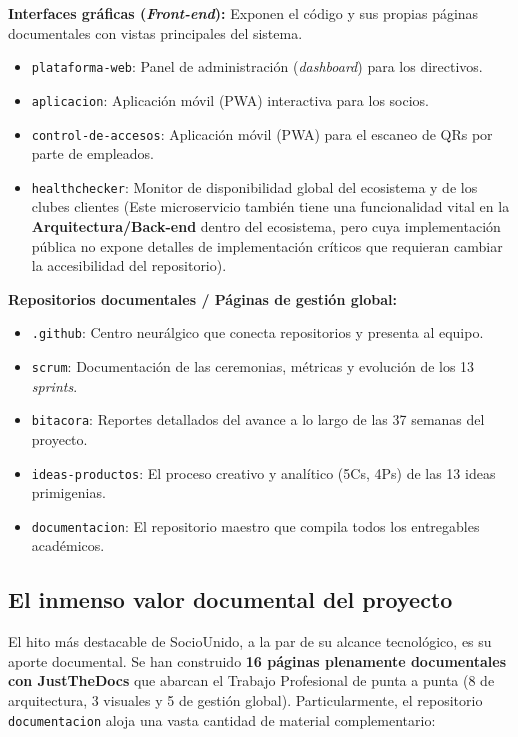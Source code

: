 \textbf{Interfaces gráficas (\textit{Front-end}):} Exponen el código y sus propias páginas documentales con vistas principales del sistema.
\begin{itemize}
    \item \texttt{plataforma-web}: Panel de administración (\textit{dashboard}) para los directivos.
    \item \texttt{aplicacion}: Aplicación móvil (PWA) interactiva para los socios.
    \item \texttt{control-de-accesos}: Aplicación móvil (PWA) para el escaneo de QRs por parte de empleados.
    \item \texttt{healthchecker}: Monitor de disponibilidad global del ecosistema y de los clubes clientes (Este microservicio también tiene una funcionalidad vital en la \textbf{Arquitectura/Back-end} dentro del ecosistema, pero cuya implementación pública no expone detalles de implementación críticos que requieran cambiar la accesibilidad del repositorio).
\end{itemize}

\textbf{Repositorios documentales / Páginas de gestión global:}
\begin{itemize}
    \item \texttt{.github}: Centro neurálgico que conecta repositorios y presenta al equipo.
    \item \texttt{scrum}: Documentación de las ceremonias, métricas y evolución de los 13 \textit{sprints}.
    \item \texttt{bitacora}: Reportes detallados del avance a lo largo de las 37 semanas del proyecto.
    \item \texttt{ideas-productos}: El proceso creativo y analítico (5Cs, 4Ps) de las 13 ideas primigenias.
    \item \texttt{documentacion}: El repositorio maestro que compila todos los entregables académicos.
\end{itemize}

\subsection{El inmenso valor documental del proyecto}

El hito más destacable de SocioUnido, a la par de su alcance tecnológico, es su aporte documental. Se han construido \textbf{16 páginas plenamente documentales con JustTheDocs} que abarcan el Trabajo Profesional de punta a punta (8 de arquitectura, 3 visuales y 5 de gestión global). Particularmente, el repositorio \texttt{documentacion} aloja una vasta cantidad de material complementario:

